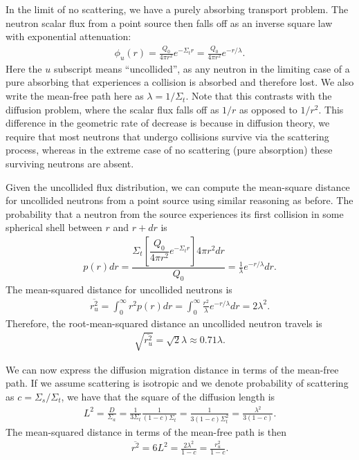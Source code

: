 In the limit of no scattering, we have a purely absorbing transport problem. The neutron scalar flux from a point source then falls off as an inverse square law with exponential attenuation:
\begin{align}
  \phi_u(r) = \frac{Q_0}{4\pi r^2} e^{-\Sigma_t r} = \frac{ Q_0 }{ 4\pi r^2 } e^{-r/\lambda} .
\end{align}
Here the $u$ subscript means ``uncollided'', as any neutron in the limiting case of a pure absorbing that experiences a collision is absorbed and therefore lost. We also write the mean-free path here as $\lambda = 1/\Sigma_t$. Note that this contrasts with the diffusion problem, where the scalar flux falls off as $1/r$ as opposed to $1/r^2$. This difference in the geometric rate of decrease is because in diffusion theory, we require that most neutrons that undergo collisions survive via the scattering process, whereas in the extreme case of no scattering (pure absorption) these surviving neutrons are absent.

Given the uncollided flux distribution, we can compute the mean-square distance for uncollided neutrons from a point source using similar reasoning as before. The probability that a neutron from the source experiences its first collision in some spherical shell between $r$ and $r + dr$ is
\begin{align}
  p(r) dr = \dfrac{ \Sigma_t \left[ \dfrac{Q_0}{4\pi r^2} e^{-\Sigma_t r} \right] 4\pi r^2 dr }{ Q_0 }
  = \frac{1}{\lambda} e^{-r/\lambda} dr. 
\end{align}
The mean-squared distance for uncollided neutrons is
\begin{align}
  \overline{r_u^2} = \int_0^\infty r^2 p(r) dr = \int_0^\infty \frac{r^2}{\lambda} e^{-r/\lambda} dr = 2 \lambda^2 .
\end{align}
Therefore, the root-mean-squared distance an uncollided neutron travels is
\begin{align}
  \sqrt{ \overline{r_u^2} } = \sqrt{2} \lambda \approx 0.71 \lambda.
\end{align}

We can now express the diffusion migration distance in terms of the mean-free path. If we assume scattering is isotropic and we denote probability of scattering as $c = \Sigma_s/\Sigma_t$, we have that the square of the diffusion length is
\begin{align}
  L^2 = \frac{D}{\Sigma_a} = \frac{1}{3 \Sigma_t} \frac{1}{(1-c)\Sigma_t} = \frac{1}{3(1-c) \Sigma_t^2} = \frac{ \lambda^2 }{ 3 (1-c) } .
\end{align}
The mean-squared distance in terms of the mean-free path is then
\begin{align}
   \overline{r^2} = 6 L^2 = \frac{ 2 \lambda^2 }{ 1 - c } = \frac{ r_u^2 }{ 1 - c }.
\end{align}

